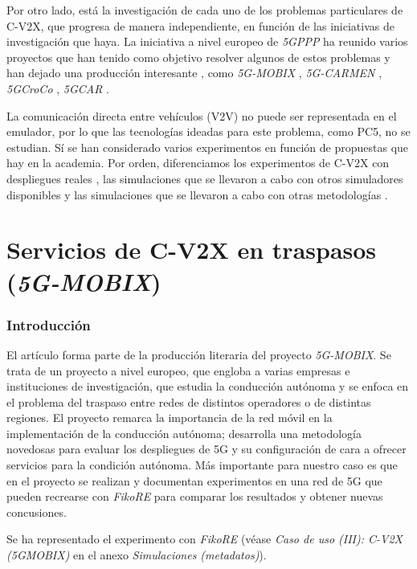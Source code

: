 \documentclass[12pt]{report} %
\begin{document}
Por otro lado, está la investigación de cada uno de los problemas particulares de C-V2X,
que progresa de manera independiente, en función de las iniciativas de investigación que haya.
La iniciativa a nivel europeo de \textit{5GPPP} \cite{RefWorks:101} ha reunido varios proyectos que han tenido como objetivo resolver algunos de estos problemas y han dejado una producción interesante \cite{RefWorks:102, RefWorks:103},
como \textit{5G-MOBIX} \cite{RefWorks:107}, \textit{5G-CARMEN} \cite{RefWorks:106}, \textit{5GCroCo} \cite{RefWorks:105}, \textit{5GCAR} \cite{RefWorks:104}.

La comunicación directa entre vehículos (V2V) no puede ser representada en el emulador, por lo que las tecnologías ideadas para este problema, como PC5, no se estudian.
Sí se han considerado varios experimentos en función de propuestas que hay en la academia.
Por orden, diferenciamos los experimentos de C-V2X con despliegues reales \cite{RefWorks:25, RefWorks:49},
las simulaciones que se llevaron a cabo con otros simuladores disponibles \cite{RefWorks:50, RefWorks:51}
y las simulaciones que se llevaron a cabo con otras metodologías \cite{RefWorks:48, RefWorks:52}.

\section{Servicios de C-V2X en traspasos (\textit{5G-MOBIX})}

\subsubsection{Introducción}

El artículo \cite{RefWorks:25} forma parte de la producción literaria del proyecto \textit{5G-MOBIX}.
\cite{RefWorks:107}
Se trata de un proyecto a nivel europeo, que engloba a varias empresas e instituciones de investigación,
que estudia la conducción autónoma y se enfoca en el problema del traspaso entre redes de distintos operadores o de distintas regiones.
El proyecto remarca la importancia de la red móvil en la implementación de la conducción autónoma;
desarrolla una metodología novedosas para evaluar los despliegues de 5G y su configuración de cara a ofrecer servicios para la condición autónoma.
Más importante para nuestro caso es que en el proyecto se realizan y documentan experimentos en una red de 5G que pueden recrearse con \textit{FikoRE} para comparar los resultados y obtener nuevas concusiones.

Se ha representado el experimento con \textit{FikoRE}
(véase \textit{Caso de uso (III): C-V2X (5GMOBIX)} en el anexo \textit{Simulaciones (metadatos)}).
\end{document}
